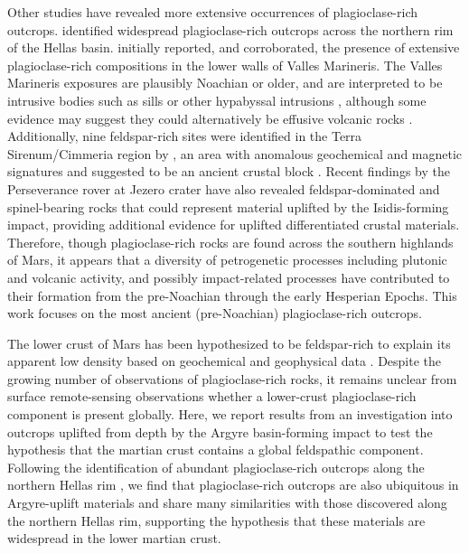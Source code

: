 \documentclass[12pt]{article}
\begin{document}
Other studies have revealed more extensive occurrences of plagioclase-rich outcrops. \citet{Phillips2022} identified widespread plagioclase-rich outcrops across the northern rim of the Hellas basin. \citet{Viviano-Beck2017} initially reported, and \citet{Flahaut2023} corroborated, the presence of extensive plagioclase-rich compositions in the lower walls of Valles Marineris. The Valles Marineris exposures are plausibly Noachian or older, and are interpreted to be intrusive bodies such as sills or other hypabyssal intrusions \citep{Viviano-Beck2017}, although some evidence may suggest they could alternatively be effusive volcanic rocks \citep{Flahaut2023}. Additionally, nine feldspar-rich sites were identified in the Terra Sirenum/Cimmeria region by \citet{Payre2022}, an area with anomalous geochemical and magnetic signatures and suggested to be an ancient crustal block \citep{Bouley2020}. Recent findings by the Perseverance rover at Jezero crater have also revealed feldspar-dominated and spinel-bearing rocks \citep{Bedford2024, Schmidt2025, Mansbach2024, Lawson2025} that could represent material uplifted by the Isidis-forming impact, providing additional evidence for uplifted differentiated crustal materials. Therefore, though plagioclase-rich rocks are found across the southern highlands of Mars, it appears that a diversity of petrogenetic processes including plutonic and volcanic activity, and possibly impact-related processes \citep{Grieve1991, Hurwitz2014, Vaughan2014, Koeppel2020} have contributed to their formation from the pre-Noachian through the early Hesperian Epochs. This work focuses on the most ancient (pre-Noachian) plagioclase-rich outcrops.

The lower crust of Mars has been hypothesized to be feldspar-rich to explain its apparent low density based on geochemical and geophysical data \citep{Baratoux2014, Goossens2017, Knapmeyer-Endrun2021}. Despite the growing number of observations of plagioclase-rich rocks, it remains unclear from surface remote-sensing observations whether a lower-crust plagioclase-rich component is present globally. Here, we report results from an investigation into outcrops uplifted from depth by the Argyre basin-forming impact to test the hypothesis that the martian crust contains a global feldspathic component. Following the identification of abundant plagioclase-rich outcrops along the northern Hellas rim \citep{Phillips2022}, we find that plagioclase-rich outcrops are also ubiquitous in Argyre-uplift materials and share many similarities with those discovered along the northern Hellas rim, supporting the hypothesis that these materials are widespread in the lower martian crust.
\end{document}
